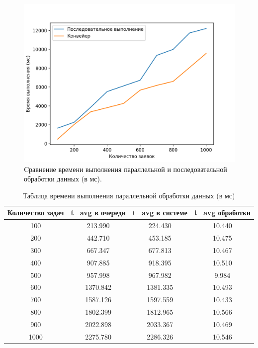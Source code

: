 \documentclass[12pt]{report}
\begin{document}
\begin{figure}[h]
	\centering
	\includegraphics[width = \linewidth]{cmp.png}
	\caption{Cравнение времени выполнения параллельной и последовательной обработки данных (в мс).}
	\label{cmp}
\end{figure}
\begin{table} [h!]
	\caption{Таблица времени выполнения параллельной обработки данных (в мс)}
	\label{tableComp}
	\begin{center}
		\begin{tabular}{|c c c c|} 
		 	\hline
			Количество задач & t_{avg} в очереди & t_{avg} в системе & t_{avg} обработки \\  
			\hline
            100 & 213.990 & 224.430 & 10.440 \\
            \hline
            200 & 442.710 & 453.185 & 10.475 \\
            \hline
            300 & 667.347 & 677.813 & 10.467 \\
            \hline
            400 & 907.885 & 918.395 & 10.510 \\
            \hline
            500 & 957.998 & 967.982 & 9.984 \\
            \hline
            600 & 1370.842 & 1381.335 & 10.493 \\
            \hline
            700 & 1587.126 & 1597.559 & 10.433 \\
            \hline
            800 & 1802.399 & 1812.965 & 10.566 \\
            \hline
            900 & 2022.898 & 2033.367 & 10.469 \\
            \hline
            1000 & 2275.780 & 2286.326 & 10.546 \\
			\hline
		\end{tabular}
	\end{center}
\end{table}
\end{document}
